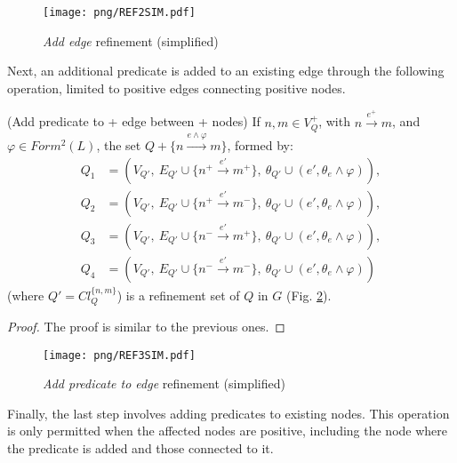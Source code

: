 \documentclass{article}%
\begin{document}
\begin{figure}[h]
    \begin{center}
        \texttt{[image: png/REF2SIM.pdf]}
    \end{center}
    \caption{%
        \textit{Add edge} refinement (simplified)
    }%
    \label{ref2}
\end{figure}

Next, an additional predicate is added to an existing edge through the following operation, limited to positive edges connecting positive nodes.

\begin{theorem}{(Add predicate to + edge between + nodes)}
    If $n,m\in V_Q^+$, with $n\stackrel {e^+}{\longrightarrow} m$, and $\varphi\in Form^2(L)$, the set $Q+\{n\stackrel {e \wedge \varphi}{\longrightarrow} m\}$, formed by:
    \begin{align*}
    Q_1 &= (V_{Q'},\ E_{Q'}\cup\{n^+\stackrel {e'}{\longrightarrow} m^+\},\ \theta_{Q'}\cup(e',\theta_e\wedge \varphi)), \\
    Q_2 &= (V_{Q'},\ E_{Q'}\cup\{n^+\stackrel {e'}{\longrightarrow} m^-\},\ \theta_{Q'}\cup(e',\theta_e\wedge \varphi)), \\
    Q_3 &= (V_{Q'},\ E_{Q'}\cup\{n^-\stackrel {e'}{\longrightarrow} m^+\},\ \theta_{Q'}\cup(e',\theta_e\wedge \varphi)), \\
    Q_4 &= (V_{Q'},\ E_{Q'}\cup\{n^-\stackrel {e'}{\longrightarrow} m^-\},\ \theta_{Q'}\cup(e',\theta_e\wedge \varphi))
    \end{align*}
    (where $Q'=Cl_Q^{\{n,m\}}$) is a refinement set of $Q$ in $G$ (Fig. \ref{ref3}).
\end{theorem}
\begin{proof}{}
	The proof is similar to the previous ones.
\end{proof}

\begin{figure}[h]
    \begin{center}
        \texttt{[image: png/REF3SIM.pdf]}
    \end{center}
    \caption{%
	\textit{Add predicate to edge} refinement (simplified)
    }%
    \label{ref3}
\end{figure}

Finally, the last step involves adding predicates to existing nodes. This operation is only permitted when the affected nodes are positive, including the node where the predicate is added and those connected to it.
\end{document}
